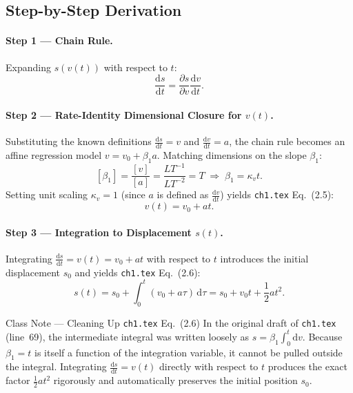 \documentclass[11pt,a4paper]{article}
\newcommand{\dd}{\mathrm{d}}
\newcommand{\pd}[2]{\frac{\partial #1}{\partial #2}}
\newcommand{\td}[2]{\frac{\dd #1}{\dd #2}}
\newcommand{\dimbr}[1]{\left[#1\right]}
\begin{document}
\subsection*{Step-by-Step Derivation}

\paragraph{Step 1 — Chain Rule.}
Expanding $s(v(t))$ with respect to $t$:
\begin{equation}
  \td{s}{t} = \pd{s}{v}\td{v}{t}.
\end{equation}

\paragraph{Step 2 — Rate-Identity Dimensional Closure for $v(t)$.}
Substituting the known definitions $\td{s}{t} = v$ and $\td{v}{t} = a$, the chain rule becomes an affine regression model $v = v_0 + \beta_1 a$. Matching dimensions on the slope $\beta_1$:
\[
  \dimbr{\beta_1} = \frac{\dimbr{v}}{\dimbr{a}} = \frac{LT^{-1}}{LT^{-2}} = T \;\Longrightarrow\; \beta_1 = \kappa_v t.
\]
Setting unit scaling $\kappa_v = 1$ (since $a$ is defined as $\td{v}{t}$) yields \texttt{ch1.tex} Eq.~(2.5):
\begin{equation}
  v(t) = v_0 + a t.
\end{equation}

\paragraph{Step 3 — Integration to Displacement $s(t)$.}
Integrating $\td{s}{t} = v(t) = v_0 + a t$ with respect to $t$ introduces the initial displacement $s_0$ and yields \texttt{ch1.tex} Eq.~(2.6):
\begin{equation}
  s(t) = s_0 + \int_0^t (v_0 + a\tau)\,\dd\tau = s_0 + v_0 t + \frac{1}{2} a t^2.
\end{equation}

\begin{insightbox}{Class Note — Cleaning Up \texttt{ch1.tex} Eq.~(2.6)}
In the original draft of \texttt{ch1.tex} (line~69), the intermediate integral was written loosely as $s = \beta_1 \int_0^t \dd v$. Because $\beta_1 = t$ is itself a function of the integration variable, it cannot be pulled outside the integral. Integrating $\td{s}{t} = v(t)$ directly with respect to $t$ produces the exact factor $\tfrac{1}{2}at^2$ rigorously and automatically preserves the initial position $s_0$.
\end{insightbox}
\end{document}
